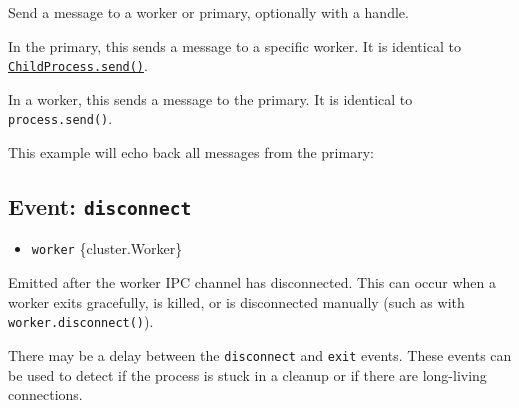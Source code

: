 Send a message to a worker or primary, optionally with a handle.

In the primary, this sends a message to a specific worker. It is
identical to
\href{child_process.md\#subprocesssendmessage-sendhandle-options-callback}{\texttt{ChildProcess.send()}}.

In a worker, this sends a message to the primary. It is identical to
\texttt{process.send()}.

This example will echo back all messages from the primary:

\begin{Shaded}
\begin{Highlighting}[]
\NormalTok{) \{}
  \OperatorTok{=}\NormalTok{()}\OperatorTok{;}
\NormalTok{(}\NormalTok{)}\OperatorTok{;}

\NormalTok{\} } \NormalTok{) \{}
  \NormalTok{(}\OperatorTok{,}\KeywordTok{=\textgreater{}}\NormalTok{ \{}
    \OperatorTok{;}
\NormalTok{  \})}\OperatorTok{;}
\NormalTok{\}}
\end{Highlighting}
\end{Shaded}

\subsection{\texorpdfstring{Event:
\texttt{\textquotesingle{}disconnect\textquotesingle{}}}{Event: \textquotesingle disconnect\textquotesingle{}}}\label{event-disconnect-1}

\begin{itemize}
\tightlist
\item
  \texttt{worker} \{cluster.Worker\}
\end{itemize}

Emitted after the worker IPC channel has disconnected. This can occur
when a worker exits gracefully, is killed, or is disconnected manually
(such as with \texttt{worker.disconnect()}).

There may be a delay between the
\texttt{\textquotesingle{}disconnect\textquotesingle{}} and
\texttt{\textquotesingle{}exit\textquotesingle{}} events. These events
can be used to detect if the process is stuck in a cleanup or if there
are long-living connections.

